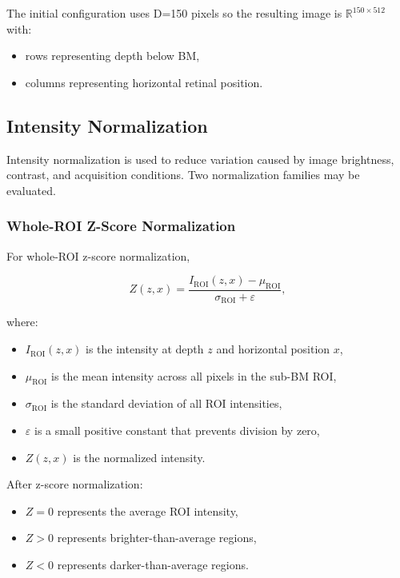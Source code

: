 \documentclass[11pt]{article}
\begin{document}
The initial configuration uses D=150 pixels so the resulting image is $\mathbb{R}^{150 \times 512}$
with:

\begin{itemize}
    \item rows representing depth below BM,
    \item columns representing horizontal retinal position.
\end{itemize}

\subsection{Intensity Normalization}
Intensity normalization is used to reduce variation caused by image brightness,
contrast, and acquisition conditions. Two normalization families may be
evaluated.

\subsubsection{Whole-ROI Z-Score Normalization}

For whole-ROI z-score normalization,

\[
Z(z,x)
=
\frac{
I_{\mathrm{ROI}}(z,x)-\mu_{\mathrm{ROI}}
}{
\sigma_{\mathrm{ROI}}+\varepsilon
},
\]

where:

\begin{itemize}
    \item \(I_{\mathrm{ROI}}(z,x)\) is the intensity at depth \(z\) and
    horizontal position \(x\),
    \item \(\mu_{\mathrm{ROI}}\) is the mean intensity across all pixels in the
    sub-BM ROI,
    \item \(\sigma_{\mathrm{ROI}}\) is the standard deviation of all ROI
    intensities,
    \item \(\varepsilon\) is a small positive constant that prevents division
    by zero,
    \item \(Z(z,x)\) is the normalized intensity.
\end{itemize}

After z-score normalization:

\begin{itemize}
    \item \(Z=0\) represents the average ROI intensity,
    \item \(Z>0\) represents brighter-than-average regions,
    \item \(Z<0\) represents darker-than-average regions.
\end{itemize}
\end{document}
